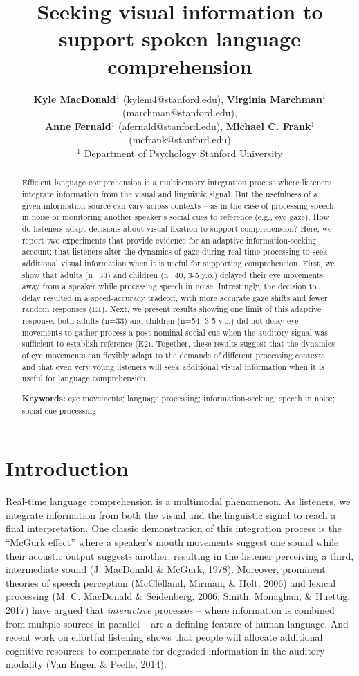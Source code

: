 \documentclass[10pt, letterpaper]{article}
\title{Seeking visual information to support spoken language comprehension}
\author{ {\large \bf Kyle MacDonald}$^1$ (kylem4@stanford.edu), {\large \bf Virginia Marchman}$^1$ (marchman@stanford.edu),  \\ {\large \bf Anne Fernald}$^1$ (afernald@stanford.edu), {\large \bf Michael C. Frank}$^1$ (mcfrank@stanford.edu) 
  \\ $^1$ Department of Psychology Stanford University}
\begin{document}
\maketitle

\begin{abstract}
Efficient language comprehension is a multisensory integration process
where listeners integrate information from the visual and linguistic
signal. But the usefulness of a given information source can vary across
contexts -- as in the case of processing speech in noise or monitoring
another speaker's social cues to reference (e.g., eye gaze). How do
listeners adapt decisions about visual fixation to support
comprehension? Here, we report two experiments that provide evidence for
an adaptive information-seeking account: that listeners alter the
dynamics of gaze during real-time processing to seek additional visual
information when it is useful for supporting comprehension. First, we
show that adults (n=33) and children (n=40, 3-5 y.o.) delayed their eye
movements away from a speaker while processing speech in noise.
Intrestingly, the decision to delay resulted in a speed-accuracy
tradeoff, with more accurate gaze shifts and fewer random responses
(E1). Next, we present results showing one limit of this adaptive
response: both adults (n=33) and children (n=54, 3-5 y.o.) did not delay
eye movements to gather process a post-nominal social cue when the
auditory signal was sufficient to establish reference (E2). Together,
these results suggest that the dynamics of eye movements can flexibly
adapt to the demands of different processing contexts, and that even
very young listeners will seek additional visual information when it is
useful for language comprehension.

\textbf{Keywords:}
eye movements; language processing; information-seeking; speech in
noise; social cue processing
\end{abstract}

\section{Introduction}\label{introduction}

Real-time language comprehension is a multimodal phenomenon. As
listeners, we integrate information from both the visual and the
linguistic signal to reach a final interpretation. One classic
demonstration of this integration process is the ``McGurk effect'' where
a speaker's mouth movements suggest one sound while their acoustic
output suggests another, resulting in the listener perceiving a third,
intermediate sound (J. MacDonald \& McGurk, 1978). Moreover, prominent
theories of speech perception (McClelland, Mirman, \& Holt, 2006) and
lexical processing (M. C. MacDonald \& Seidenberg, 2006; Smith,
Monaghan, \& Huettig, 2017) have argued that \emph{interactive}
processes -- where information is combined from multple sources in
parallel -- are a defining feature of human language. And recent work on
effortful listening shows that people will allocate additional cognitive
resources to compensate for degraded information in the auditory
modality (Van Engen \& Peelle, 2014).
\end{document}
